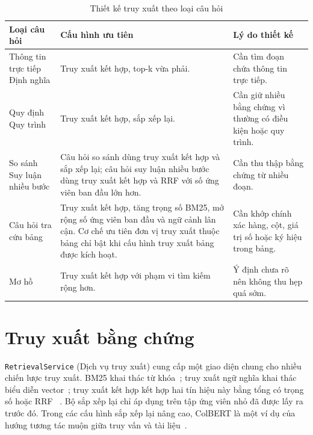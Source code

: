 \documentclass[../DoAn.tex]{subfiles}
\begin{document}
\begin{table}[H]
\centering
\small
\renewcommand{\arraystretch}{1.2}
\caption{Thiết kế truy xuất theo loại câu hỏi}
\label{tab:query-type-retrieval-plan}
\begin{tabularx}{\textwidth}{
    |>{\raggedright\arraybackslash}p{}
    |>{\raggedright\arraybackslash}p{}
    |>{\raggedright\arraybackslash}X|
}
\hline
\textbf{Loại câu hỏi} & \textbf{Cấu hình ưu tiên} & \textbf{Lý do thiết kế} \\
\hline
Thông tin trực tiếp \newline
Định nghĩa &
Truy xuất kết hợp, top-k vừa phải. &
Cần tìm đoạn chứa thông tin trực tiếp. \\
\hline
Quy định \newline Quy trình &
Truy xuất kết hợp, sắp xếp lại. &
Cần giữ nhiều bằng chứng vì thường có điều kiện hoặc quy trình. \\
\hline
So sánh \newline Suy luận nhiều bước &
Câu hỏi so sánh dùng truy xuất kết hợp và sắp xếp lại; câu hỏi suy luận nhiều bước dùng truy xuất kết hợp và RRF với số ứng viên ban đầu lớn hơn. &
Cần thu thập bằng chứng từ nhiều đoạn. \\
\hline
Câu hỏi tra cứu bảng &
Truy xuất kết hợp, tăng trọng số BM25, mở rộng số ứng viên ban đầu và ngữ cảnh lân cận. Cơ chế ưu tiên đơn vị truy xuất thuộc bảng chỉ bật khi cấu hình truy xuất bảng được kích hoạt. &
Cần khớp chính xác hàng, cột, giá trị số hoặc ký hiệu trong bảng. \\
\hline
Mơ hồ &
Truy xuất kết hợp với phạm vi tìm kiếm rộng hơn. &
Ý định chưa rõ nên không thu hẹp quá sớm. \\
\hline
\end{tabularx}
\end{table}

\section{Truy xuất bằng chứng}
\label{section:evidence-retrieval-design}

\texttt{RetrievalService} (Dịch vụ truy xuất) cung cấp một giao diện chung cho nhiều chiến lược truy xuất.
BM25 khai thác từ khóa~\cite{robertson2009bm25}; truy xuất ngữ nghĩa khai
thác biểu diễn vector~\cite{karpukhin2020dpr,reimers2019sentencebert}; truy xuất kết hợp
kết hợp hai tín hiệu này bằng tổng có trọng số hoặc RRF~
\cite{cormack2009rrf}. Bộ sắp xếp lại chỉ áp dụng trên tập ứng viên nhỏ đã được lấy ra
trước đó. Trong các cấu hình sắp xếp lại nâng cao, ColBERT là một ví dụ của
hướng tương tác muộn giữa truy vấn và tài liệu~\cite{khattab2020colbert}.
\end{document}
